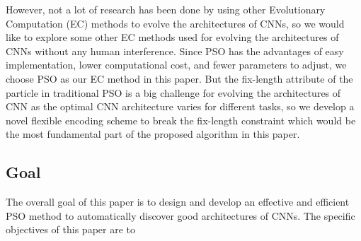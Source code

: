 \documentclass[conference]{IEEEtran}
\begin{document}

However, not a lot of research has been done by using other Evolutionary Computation (EC) methods to evolve the architectures of CNNs, so we would like to explore some other EC methods used for evolving the architectures of CNNs without any human interference. Since PSO has the advantages of easy implementation, lower computational cost, and fewer parameters to adjust, we choose PSO as our EC method in this paper. But the fix-length attribute of the particle in traditional PSO is a big challenge for evolving the architectures of CNN as the optimal CNN architecture varies for different tasks, so we develop a novel flexible encoding scheme to break the fix-length constraint which would be the most fundamental part of the proposed algorithm in this paper. 


\subsection{Goal}
The overall goal of this paper is to design and develop an effective and efficient PSO method to automatically discover good architectures of CNNs. The specific objectives of this paper are to
\end{document}
